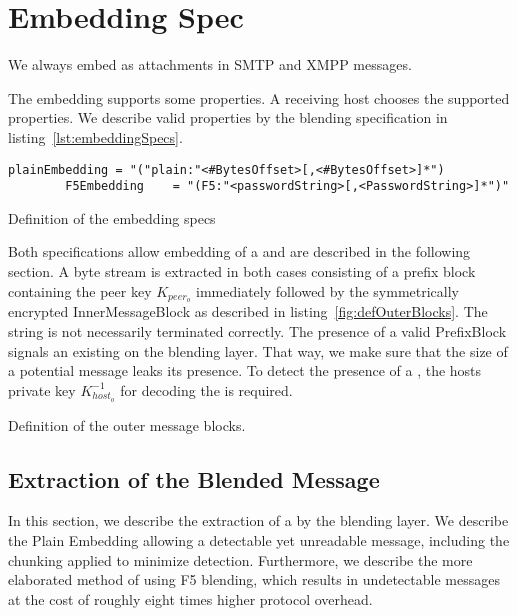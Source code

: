 \section{Embedding Spec}
We always embed \VortexMessages{} as attachments in SMTP and XMPP messages. 

The embedding supports some properties. A receiving host chooses the supported properties. We describe valid properties by the blending specification in listing~\ref{lst:embeddingSpecs}.

\begin{lstfloat}[h!]
	\begin{lstlisting}[language=EBNF]
		plainEmbedding = "("plain:"<#BytesOffset>[,<#BytesOffset>]*")
		F5Embedding    = "(F5:"<passwordString>[,<PasswordString>]*")"
	\end{lstlisting}
	\caption{Definition of the embedding specs}
	\label{lst:embeddingSpecs}
\end{lstfloat}

Both specifications allow embedding of a \VortexMessage{} and are described in the following section. A byte stream is extracted in both cases consisting of a prefix block containing the peer key $K_{peer_o}$ immediately followed by the symmetrically encrypted InnerMessageBlock as described in listing~\ref{fig:defOuterBlocks}. The string is not necessarily terminated correctly. The presence of a valid PrefixBlock signals an existing \VortexMessage{} on the blending layer. That way, we make sure that the size of a potential message leaks its presence. To detect the presence of a \VortexMessage{}, the hosts private key $K^{-1}_{host_o}$ for decoding the is required. 

\begin{lstfloat}[ht]
	
	\caption{Definition of the outer message blocks.}
	\label{fig:defOuterBlocks}
\end{lstfloat}

\subsection{Extraction of the Blended Message}
In this section, we describe the extraction of a \VortexMessage{} by the blending layer. We describe the Plain Embedding allowing a detectable yet unreadable message, including the chunking applied to minimize detection. Furthermore, we describe the more elaborated method of using F5  blending, which results in undetectable messages at the cost of roughly eight times higher protocol overhead.

